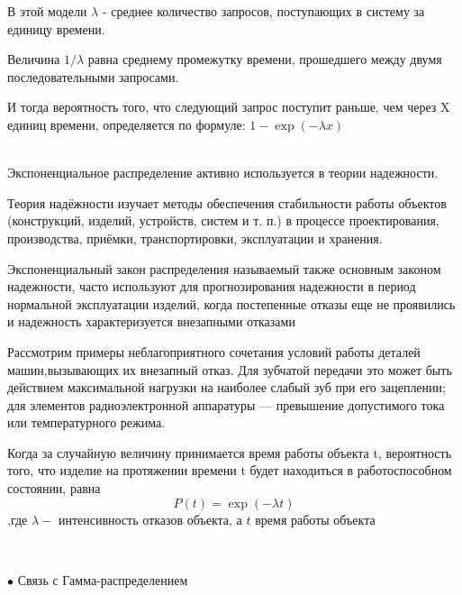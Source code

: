 \documentclass[a4paper,12pt, oneside]{book}
\begin{document}
{{В этой модели $\lambda $ - среднее количество запросов, поступающих в систему за единицу времени. 

Величина $1/\lambda $ равна среднему промежутку времени, прошедшего между двумя последовательными запросами.

И тогда  вероятность того, что следующий запрос поступит раньше, чем через X единиц времени, определяется по формуле:  $1- \exp(-\lambda x)$ 
\\


\vspace{5mm}
\\
\vspace{5mm}

Экспоненциальное распределение активно используется в теории  надежности.

Теория надёжности изучает методы обеспечения стабильности работы объектов (конструкций, изделий, устройств, систем и т. п.) в процессе проектирования, производства, приёмки, транспортировки, эксплуатации и хранения.

Экспоненциальный закон распределения называемый также основным законом надежности, часто используют для прогнозирования надежности в период нормальной эксплуатации изделий, когда постепенные отказы еще не проявились и надежность характеризуется внезапными отказами

Рассмотрим примеры неблагоприятного сочетания условий работы деталей машин,вызывающих их внезапный отказ. Для зубчатой передачи это может быть действием максимальной нагрузки на наиболее слабый зуб при его зацеплении;
для элементов радиоэлектронной аппаратуры — превышение допустимого тока или температурного режима.

Когда за случайную величину принимается время работы объекта t, вероятность того, что изделие на протяжении времени t будет находиться в работоспособном состоянии, равна
$$
P(t) = \exp(-\lambda t)
$$
,где $\lambda-$ интенсивность отказов объекта, а $t$ время работы объекта

\vspace{5mm}
\\
\vspace{5mm}

{\sf$\bullet$ Связь с Гамма-распределением}
\vspace{5mm}

}}
\end{document}
